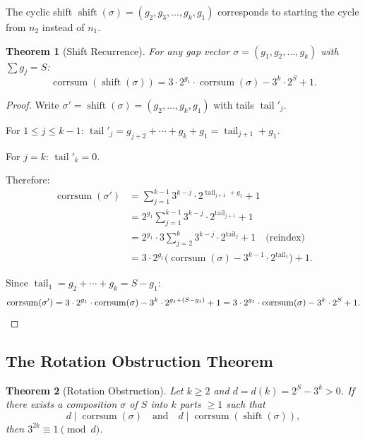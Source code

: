 \documentclass[12pt,a4paper]{amsart}
\theoremstyle{plain}
\newtheorem{theorem}{Theorem}[section]
\theoremstyle{definition}
\newcommand{\corrsum}{\operatorname{corrsum}}
\newcommand{\shift}{\operatorname{shift}}
\newcommand{\tail}{\operatorname{tail}}
\begin{document}
The cyclic shift $\shift(\sigma) = (g_2, g_3, \ldots, g_k, g_1)$ corresponds to starting the cycle from $n_2$ instead of $n_1$.

\begin{theorem}[Shift Recurrence]
\label{thm:shift}
For any gap vector $\sigma = (g_1, g_2, \ldots, g_k)$ with $\sum g_j = S$:
\begin{equation}
\label{eq:shift}
\corrsum(\shift(\sigma)) = 3 \cdot 2^{g_1} \cdot \corrsum(\sigma) - 3^k \cdot 2^S + 1.
\end{equation}
\end{theorem}

\begin{proof}
Write $\sigma' = \shift(\sigma) = (g_2, \ldots, g_k, g_1)$ with tails $\tail'_j$.

For $1 \leq j \leq k-1$: $\tail'_j = g_{j+2} + \cdots + g_k + g_1 = \tail_{j+1} + g_1$.

For $j = k$: $\tail'_k = 0$.

Therefore:
\begin{align*}
\corrsum(\sigma') &= \sum_{j=1}^{k-1} 3^{k-j} \cdot 2^{\tail_{j+1} + g_1} + 1 \\
&= 2^{g_1} \sum_{j=1}^{k-1} 3^{k-j} \cdot 2^{\tail_{j+1}} + 1 \\
&= 2^{g_1} \cdot 3 \sum_{j=2}^{k} 3^{k-j} \cdot 2^{\tail_j} + 1 \quad \text{(reindex)} \\
&= 3 \cdot 2^{g_1} \bigl(\corrsum(\sigma) - 3^{k-1} \cdot 2^{\tail_1}\bigr) + 1.
\end{align*}

Since $\tail_1 = g_2 + \cdots + g_k = S - g_1$:
\[
\corrsum(\sigma') = 3 \cdot 2^{g_1} \cdot \corrsum(\sigma) - 3^k \cdot 2^{g_1 + (S-g_1)} + 1 = 3 \cdot 2^{g_1} \cdot \corrsum(\sigma) - 3^k \cdot 2^S + 1. \qedhere
\]
\end{proof}

\subsection{The Rotation Obstruction Theorem}

\begin{theorem}[Rotation Obstruction]
\label{thm:rotation}
Let $k \geq 2$ and $d = d(k) = 2^S - 3^k > 0$. If there exists a composition $\sigma$ of $S$ into $k$ parts $\geq 1$ such that
\[
d \mid \corrsum(\sigma) \quad \text{and} \quad d \mid \corrsum(\shift(\sigma)),
\]
then $3^{2k} \equiv 1 \pmod{d}$.
\end{theorem}
\end{document}
